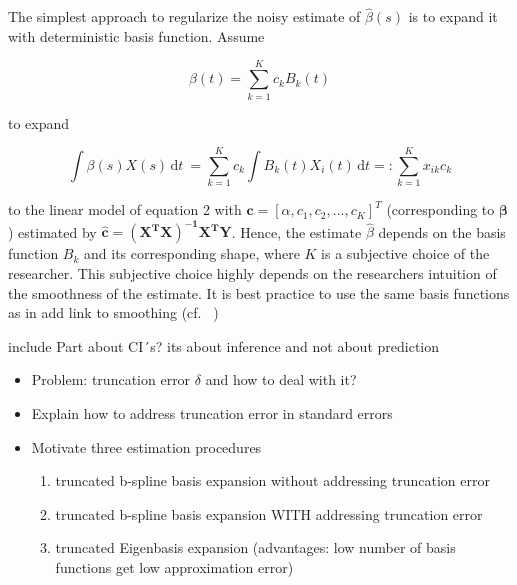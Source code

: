 \documentclass[11pt,twoside,a4paper]{article}
\begin{document}
	The simplest approach to regularize the noisy estimate of $\hat{\beta}(s)$	is to expand it with deterministic basis function. Assume 

	\begin{equation}
     	\beta(t) =  \sum_{k=1}^{K} c_{k}B_{k}(t)
    \end{equation}

    to expand
    
    \begin{equation}
    	\int \beta(s)X(s) \,\mathrm{d}t \ = \sum_{k=1}^{K} c_{k} \int B_{k}(t)X_{i}(t)\,\mathrm{d}t =: \sum_{k=1}^{K} x_{ik} c_{k} 
    \end{equation}

    to the linear model of equation 2 with $\mathbf{c} = [\alpha, c_1, c_2,...,c_K]^T$ (corresponding to $\mathbf{\beta}$) estimated by $\mathbf{\hat{c}} = \mathbf{(X^{T}X)^{-1}X^{T}Y}$. Hence, the estimate $\hat{\beta}$ depends on the basis function $B_{k}$ and its corresponding shape, where $K$ is a subjective choice of the researcher. This subjective choice highly depends on the researchers intuition of the smoothness of the estimate. It is best practice to use the same basis functions as in {\color{red} add link to smoothing} (cf. ~\cite{kokoszka_introduction_2017})
    
    {\color{red} include Part about CI´s? its about inference and not about prediction}
    
	\begin{itemize}
		\item Problem: truncation error $\delta$ and how to deal with it?
	\end{itemize}

	\begin{itemize}	
		\item Explain how to address truncation error in standard errors
		\item Motivate three estimation procedures
		\begin{enumerate}
			\item truncated b-spline basis expansion without addressing truncation error
			\item truncated b-spline basis expansion WITH addressing truncation error
			\item truncated Eigenbasis expansion (advantages: low number of basis functions get low approximation error)
		\end{enumerate}
	\end{itemize}
	
\end{document}
